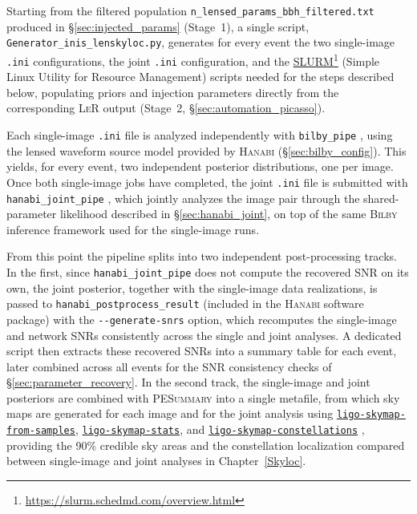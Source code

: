 Starting from the filtered population \texttt{n\_lensed\_params\_bbh\_filtered.txt} produced in \S\ref{sec:injected_params} (Stage~1), a single script, \texttt{Generator\_inis\_lenskyloc.py}, generates for every event the two single-image \texttt{.ini} configurations, the joint \texttt{.ini} configuration, and the \href{https://slurm.schedmd.com/overview.html}{SLURM}\footnote{\url{https://slurm.schedmd.com/overview.html}} (Simple Linux Utility for Resource Management) scripts needed for the steps described below, populating priors and injection parameters directly from the corresponding \textsc{LeR} output (Stage~2, \S\ref{sec:automation_picasso}).

Each single-image \texttt{.ini} file is analyzed independently with \texttt{bilby\_pipe} \cite{bilby_pipe_paper}, using the lensed waveform source model provided by \textsc{Hanabi} (\S\ref{sec:bilby_config}). This yields, for every event, two independent posterior distributions, one per image. Once both single-image jobs have completed, the joint \texttt{.ini} file is submitted with \texttt{hanabi\_joint\_pipe} \cite{PE_lensing_bayes}, which jointly analyzes the image pair through the shared-parameter likelihood described in \S\ref{sec:hanabi_joint}, on top of the same \textsc{Bilby} inference framework used for the single-image runs.

From this point the pipeline splits into two independent post-processing tracks. In the first, since \texttt{hanabi\_joint\_pipe} does not compute the recovered SNR on its own, the joint posterior, together with the single-image data realizations, is passed to \texttt{hanabi\_\allowbreak postprocess\_\allowbreak result} (included in the \textsc{Hanabi} software package) with the \texttt{-{}-generate-snrs} option, which recomputes the single-image and network SNRs consistently across the single and joint analyses. A dedicated script then extracts these recovered SNRs into a summary table for each event, later combined across all events for the SNR consistency checks of \S\ref{sec:parameter_recovery}. In the second track, the single-image and joint posteriors are combined with \textsc{PESummary} \cite{PESummary} into a single metafile, from which sky maps are generated for each image and for the joint analysis using \href{https://lscsoft.docs.ligo.org/ligo.skymap/tool/ligo_skymap_from_samples.html}{\texttt{ligo-skymap-from-samples}}, \href{https://lscsoft.docs.ligo.org/ligo.skymap/tool/ligo_skymap_stats.html}{\texttt{ligo-skymap-stats}}, and \href{https://lscsoft.docs.ligo.org/ligo.skymap/tool/ligo_skymap_constellations.html}{\texttt{ligo-skymap-constellations}} \cite{SingerPrice2016, ligo_skymap_software}, providing the 90\% credible sky areas and the constellation localization compared between single-image and joint analyses in Chapter~\ref{Skyloc}.

